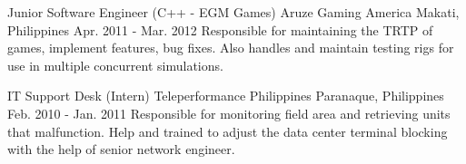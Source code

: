 \begin{cventries}
    \cventry
        {Junior Software Engineer (C++ - EGM Games)}
        {Aruze Gaming America}
        {Makati, Philippines}
        {Apr. 2011 - Mar. 2012}
        {Responsible for maintaining the TRTP of games, implement features, bug fixes. Also handles and maintain testing rigs for use in multiple concurrent simulations.}

    \cventry
        {IT Support Desk (Intern)}
        {Teleperformance Philippines}
        {Paranaque, Philippines}
        {Feb. 2010 - Jan. 2011}
        {Responsible for monitoring field area and retrieving units that malfunction. Help and trained to adjust the data center terminal blocking with the help of senior network engineer.}

\end{cventries}

\vspace{1mm}
